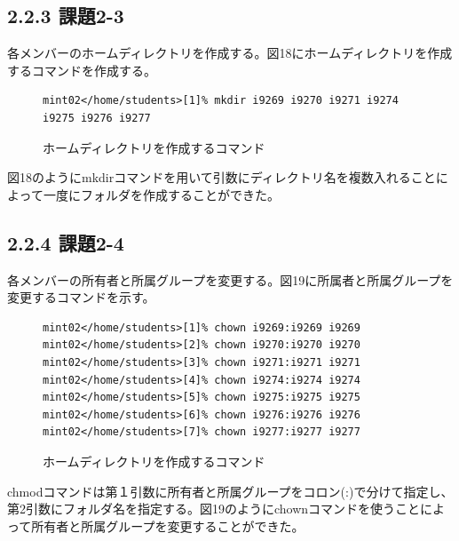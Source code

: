 \documentclass[12pt]{jreport}
\begin{document}
            \subsection*{2.2.3 課題2-3}
                各メンバーのホームディレクトリを作成する。図18にホームディレクトリを作成するコマンドを作成する。
                \begin{figure}[H]
                    \begin{center}
                        \begin{screen}
                            \begin{verbatim}
mint02</home/students>[1]% mkdir i9269 i9270 i9271 i9274 i9275 i9276 i9277
                            \end{verbatim}
                        \end{screen}
                        \caption{ホームディレクトリを作成するコマンド}
                        \label{18}
                    \end{center}
                \end{figure}
                図18のようにmkdirコマンドを用いて引数にディレクトリ名を複数入れることによって一度にフォルダを作成することができた。
            \subsection*{2.2.4 課題2-4}
                各メンバーの所有者と所属グループを変更する。図19に所属者と所属グループを変更するコマンドを示す。
                \begin{figure}[H]
                    \begin{center}
                        \begin{screen}
                            \begin{verbatim}
mint02</home/students>[1]% chown i9269:i9269 i9269
mint02</home/students>[2]% chown i9270:i9270 i9270
mint02</home/students>[3]% chown i9271:i9271 i9271
mint02</home/students>[4]% chown i9274:i9274 i9274
mint02</home/students>[5]% chown i9275:i9275 i9275
mint02</home/students>[6]% chown i9276:i9276 i9276
mint02</home/students>[7]% chown i9277:i9277 i9277
                            \end{verbatim}
                        \end{screen}
                        \caption{ホームディレクトリを作成するコマンド}
                        \label{19}
                    \end{center}
                \end{figure}
                chmodコマンドは第１引数に所有者と所属グループをコロン(:)で分けて指定し、第2引数にフォルダ名を指定する。図19のようにchownコマンドを使うことによって所有者と所属グループを変更することができた。
\end{document}
